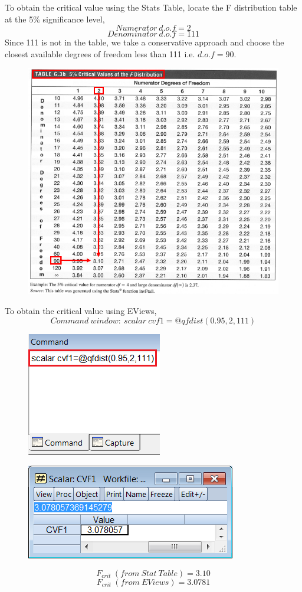\documentclass[12pt]{report}
\begin{document}
\noindent To obtain the critical value using the Stats Table, locate the F distribution table at the 5\% significance level,
$$Numerator\ d.o.f = 2$$
$$Denominator\ d.o.f = 111$$
\noindent Since 111 is not in the table, we take a conservative approach and choose the closest available degrees of freedom less than 111 i.e. $d.o.f=90$. 
\begin{figure}[H]
	\centerline{\includegraphics{q1_25}}
\end{figure}
\vspace{-\baselineskip}
\noindent To obtain the critical value using EViews,
$$Command\ window:\ scalar\ cvf1=@qfdist(0.95,2,111)$$
\begin{figure}[H]
	\centering
	\includegraphics{q1_26}
\end{figure}
\vspace{-\baselineskip}
\begin{figure}[H]
	\centering
	\includegraphics{q1_27}
\end{figure}
\vspace{-\baselineskip}
$$F_{crit}\ (from\ Stat\ Table) = 3.10$$
$$F_{crit}\ (from\ EViews) = 3.0781$$
\end{document}
